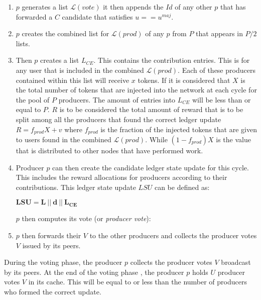 \begin{enumerate}
\item $p$ generates a list $\mathcal{L}(vote)$ it then appends the $Id$ of any other $p$ that has forwarded a $C$ candidate that satisfies $u == u^{maj}$.
\item $p$ creates the combined list for $\mathcal{L}(prod)$ of any $p$ from $P$ that appears in $P/2$ lists.
\item Then $p$ creates a list $L_{CE}$. This contains the contribution entries. This is for any user that is included in the combined $\mathcal{L}(prod)$. Each of these producers contained within this list will receive $x$ tokens. If it is considered that $X$ is the total number of tokens that are injected into the network at each cycle for the pool of $P$ producers. The amount of entries into $L_{CE}$ will be less than or equal to $P$. $R$ is to be considered the total amount of reward that is to be split among all the producers that found the correct ledger update $R = f_{prod}X + v$ where $f_{prod}$ is the fraction of the injected tokens that are given to users found in the combined $\mathcal{L}(prod)$. While $(1-f_{prod})X$ is the value that is distributed to other nodes that have performed work.
\item Producer $p$ can then create the candidate ledger state update for this cycle. This includes the reward allocations for producers according to their contributions. This ledger state update $LSU$ can be defined as:

\begin{center}
$\mathbf{LSU = L~||~d~||~L_{CE}}$
\end{center}


$p$ then computes its vote (or \textit{producer vote}):
\begin{center}
\end{center}


\item $p$ then forwards their $V$ to the other producers and collects the producer votes $V$ issued by its peers.

\end{enumerate}


During the voting phase, the producer $p$ collects the producer votes $V$ broadcast by its peers. At the end of the voting phase , the producer $p$ holds $U$ producer votes $V$ in its cache. This will be equal to or less than the number of producers who formed the correct update. 
